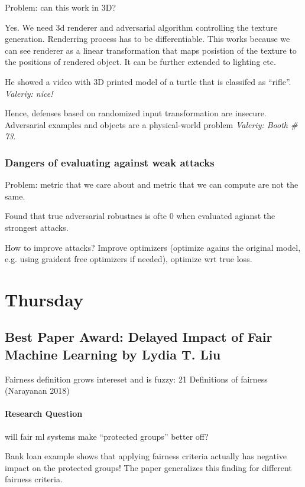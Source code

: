 \documentclass[11pt,oneside,a4paper]{scrartcl}
\newcommand{\valeriy}[1]{{\color{blue}\textit{Valeriy: #1}}}
\begin{document}
Problem: can this work in 3D?

Yes. We need 3d renderer and adversarial algorithm controlling the
texture generation. Renderring process has to be differentiable. This
works because we can see renderer as a linear transformation that maps
posistion of the texture to the positions of rendered object. It can
be further extended to lighting etc.

He showed a video with 3D printed model of a turtle that is classifed
as ``rifle''. \valeriy{nice!}

Hence, defenses based on randomized input transformation are
insecure. Adversarial examples and objects are a physical-world
problem \valeriy{Booth \# 73.}

\subsubsection{Dangers of evaluating against weak attacks \cite{uesato18a}}
\label{sec:dang-eval-against}

Problem: metric that we care about and metric that we can compute are
not the same.

Found that true adversarial robustnes is ofte 0 when evaluated agianst
the strongest attacks.

How to improve attacks? Improve optimizers (optimize agains the
original model, e.g. using graident free optimizers if needed), optimize wrt true loss.

\section{Thursday}
\label{sec:thursday}

\subsection{Best Paper Award: Delayed Impact of Fair Machine Learning by Lydia T. Liu \cite{liu18c}}
\label{sec:delayed-impact-fair}


Fairness definition grows intereset and is fuzzy: 21 Definitions of fairness (Narayanan 2018)

\paragraph{Research Question}
will fair ml systems make ``protected groups'' better off?

Bank loan example shows that applying fairness criteria actually has
negative impact on the protected groups!  The paper generalizes this
finding for different fairness criteria.
\end{document}
